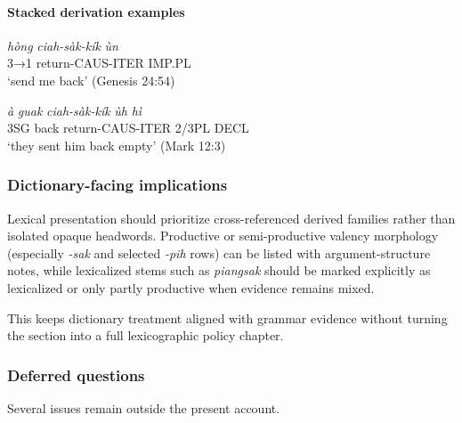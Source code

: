 \documentclass[
  11pt,
  a4paper,
]{article}
\newcommand{\tdim}[1]{\textit{#1}}
\newcommand{\tdimword}[1]{\textit{#1}}
\renewcommand{\textsc}[1]{{\footnotesize\MakeUppercase{#1}}}
\newcommand{\glossquote}[1]{`#1'}
\begin{document}
\paragraph{Stacked derivation
examples}\label{stacked-derivation-examples}

\begin{exe}
\ex \label{ex:deriv-ciahsakkik-gen24}
\gll \tdimword{hòng} \tdimword{ciah-sàk-kík} \tdimword{ùn} \\
     \textsc{3→1} return-\textsc{caus}-\textsc{iter} \textsc{imp}.\textsc{pl} \\
\glt \glossquote{send me back} (Genesis 24:54)
\end{exe}

\begin{exe}
\ex \label{ex:deriv-ciahsakkik-mark12}
\gll \tdimword{à} \tdimword{guak} \tdimword{ciah-sàk-kík} \tdimword{ùh} \tdimword{hì} \\
     \textsc{3sg} back return-\textsc{caus}-\textsc{iter} 2/3PL \textsc{decl} \\
\glt \glossquote{they sent him back empty} (Mark 12:3)
\end{exe}

\subsubsection{Dictionary-facing
implications}\label{dictionary-facing-implications-2}

Lexical presentation should prioritize cross-referenced derived families
rather than isolated opaque headwords. Productive or semi-productive
valency morphology (especially \tdim{-sak} and selected \tdim{-pih}
rows) can be listed with argument-structure notes, while lexicalized
stems such as \tdim{piangsak} should be marked explicitly as lexicalized
or only partly productive when evidence remains mixed.

This keeps dictionary treatment aligned with grammar evidence without
turning the section into a full lexicographic policy chapter.

\subsubsection{Deferred questions}\label{deferred-questions-3}

Several issues remain outside the present account.
\end{document}
